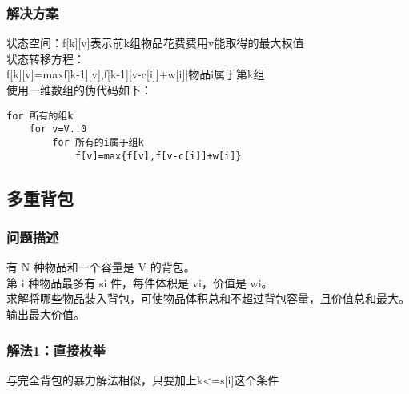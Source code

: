    \subsubsection{解决方案}
        状态空间：f[k][v]表示前k组物品花费费用v能取得的最大权值\\
        状态转移方程：\\
        f[k][v]=max{f[k-1][v],f[k-1][v-c[i]]+w[i]|物品i属于第k组}\\
        使用一维数组的伪代码如下：
\begin{lstlisting}
for 所有的组k
    for v=V..0
        for 所有的i属于组k
            f[v]=max{f[v],f[v-c[i]]+w[i]}
\end{lstlisting}

\subsection{多重背包}
    \subsubsection{问题描述}
        有 N 种物品和一个容量是 V 的背包。\\
        第 i 种物品最多有 si 件，每件体积是 vi，价值是 wi。\\
        求解将哪些物品装入背包，可使物品体积总和不超过背包容量，且价值总和最大。\\
        输出最大价值。
    \subsubsection{解法1：直接枚举}
        与完全背包的暴力解法相似，只要加上k<=s[i]这个条件
